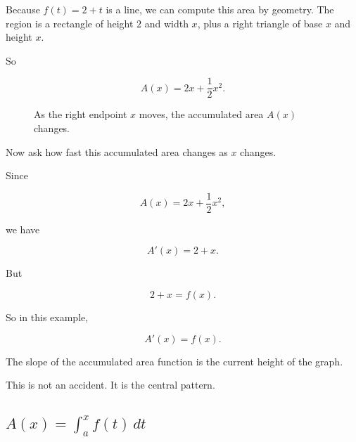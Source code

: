 Because \(f(t)=2+t\) is a line, we can compute this area by geometry.  The region is a
rectangle of height \(2\) and width \(x\), plus a right triangle of base \(x\) and height
\(x\).

So

\[
A(x)=2x+\frac12 x^2.
\]

\begin{figure}[h]
\centering
{}
\caption{As the right endpoint \(x\) moves, the accumulated area \(A(x)\) changes.}
\label{fig:area-moving-endpoint-line}
\end{figure}

Now ask how fast this accumulated area changes as \(x\) changes.

Since

\[
A(x)=2x+\frac12x^2,
\]

we have

\[
A'(x)=2+x.
\]

But

\[
2+x=f(x).
\]

So in this example,

\[
\boxed{A'(x)=f(x).}
\]

The slope of the accumulated area function is the current height of the graph.

This is not an accident.  It is the central pattern.

\subsection{\texorpdfstring{\(A(x)=\int_a^x f(t)\,dt\)}{A(x)=int_a^x f(t) dt}}
\label{subsec:accumulation-function-definition}

